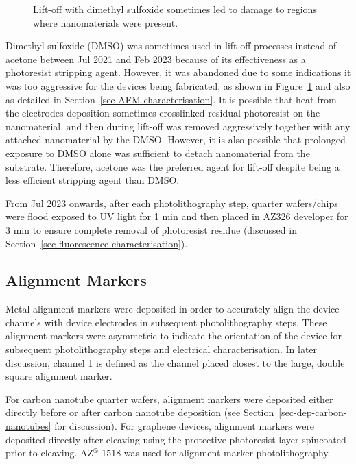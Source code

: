 \documentclass[
  a4paper,
]{scrbook}
\begin{document}
\begin{figure}
\begin{minipage}[t]{0.47\linewidth}
{{}

}

\end{minipage}%

\caption{\label{fig-dmso-damage}Lift-off with dimethyl sulfoxide
sometimes led to damage to regions where nanomaterials were present.}

\end{figure}

Dimethyl sulfoxide (DMSO) was sometimes used in lift-off processes
instead of acetone between Jul 2021 and Feb 2023 because of its
effectiveness as a photoresist stripping agent. However, it was
abandoned due to some indications it was too aggressive for the devices
being fabricated, as shown in Figure~\ref{fig-dmso-damage} and also as
detailed in Section~\ref{sec-AFM-characterisation}. It is possible that
heat from the electrodes deposition sometimes crosslinked residual
photoresist on the nanomaterial, and then during lift-off was removed
aggressively together with any attached nanomaterial by the DMSO.
However, it is also possible that prolonged exposure to DMSO alone was
sufficient to detach nanomaterial from the substrate. Therefore, acetone
was the preferred agent for lift-off despite being a less efficient
stripping agent than DMSO.

From Jul 2023 onwards, after each photolithography step, quarter
wafers/chips were flood exposed to UV light for 1 min and then placed in
AZ326 developer for 3 min to ensure complete removal of photoresist
residue (discussed in Section~\ref{sec-fluorescence-characterisation}).

\hypertarget{sec-align}{%
\subsection{Alignment Markers}\label{sec-align}}

Metal alignment markers were deposited in order to accurately align the
device channels with device electrodes in subsequent photolithography
steps. These alignment markers were asymmetric to indicate the
orientation of the device for subsequent photolithography steps and
electrical characterisation. In later discussion, channel 1 is defined
as the channel placed closest to the large, double square alignment
marker.

For carbon nanotube quarter wafers, alignment markers were deposited
either directly before or after carbon nanotube deposition (see
Section~\ref{sec-dep-carbon-nanotubes} for discussion). For graphene
devices, alignment markers were deposited directly after cleaving using
the protective photoresist layer spincoated prior to cleaving.
AZ\(^\circledR\) 1518 was used for alignment marker photolithography.
\end{document}
